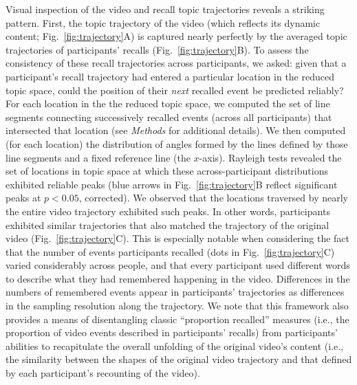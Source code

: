 \documentclass{article}
\begin{document}
Visual inspection of the video and recall topic trajectories reveals a striking pattern.  First, the topic trajectory of the video (which reflects its dynamic content; Fig.~\ref{fig:trajectory}A) is captured nearly perfectly by the averaged topic trajectories of participants' recalls (Fig.~\ref{fig:trajectory}B).  To assess the consistency of these recall trajectories across participants, we asked: given that a participant's recall trajectory had entered a particular location in the reduced topic space, could the position of their \textit{next} recalled event be predicted reliably?  For each location in the the reduced topic space, we computed the set of line segments connecting successively recalled events (across all participants) that intersected that location (see \textit{Methods} for additional details).  We then computed (for each location) the distribution of angles formed by the lines defined by those line segments and a fixed reference line (the $x$-axis).  Rayleigh tests revealed the set of locations in topic space at which these across-participant distributions exhibited reliable peaks (blue arrows in Fig.~\ref{fig:trajectory}B reflect significant peaks at $p < 0.05$, corrected).  We observed that the locations traversed by nearly the entire video trajectory exhibited such peaks.  In other words, participants exhibited similar trajectories that also matched the trajectory of the original video (Fig.~\ref{fig:trajectory}C).  This is especially notable when considering the fact that the number of events participants recalled (dots in Fig.~\ref{fig:trajectory}C) varied considerably across people, and that every participant used different words to describe what they had remembered happening in the video.  Differences in the numbers of remembered events appear in participants' trajectories as differences in the sampling resolution along the trajectory.  We note that this framework also provides a means of disentangling classic ``proportion recalled'' measures (i.e., the proportion of video events described in participants' recalls) from participants' abilities to recapitulate the overall unfolding of the original video's content (i.e., the similarity between the shapes of the original video trajectory and that defined by each participant's recounting of the video).
\end{document}
